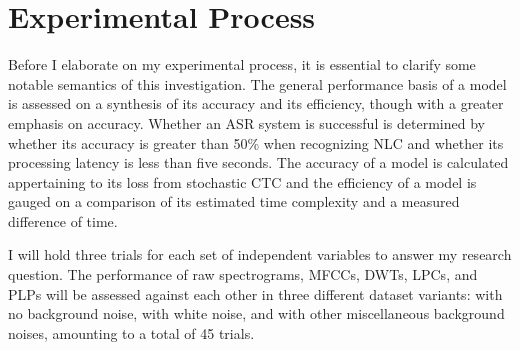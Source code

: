 \section{Experimental Process}

Before I elaborate on my experimental process, it is essential to clarify some notable semantics of this investigation. The general performance basis of a model is assessed on a synthesis of its accuracy and its efficiency, though with a greater emphasis on accuracy. Whether an ASR system is successful is determined by whether its accuracy is greater than 50\% when recognizing NLC and whether its processing latency is less than five seconds. The accuracy of a model is calculated appertaining to its loss from stochastic CTC and the efficiency of a model is gauged on a comparison of its estimated time complexity and a measured difference of time. 
\newline\par
I will hold three trials for each set of independent variables to answer my research question. The performance of raw spectrograms, MFCCs, DWTs, LPCs, and PLPs will be assessed against each other in three different dataset variants: with no background noise, with white noise, and with other miscellaneous background noises, amounting to a total of 45 trials.